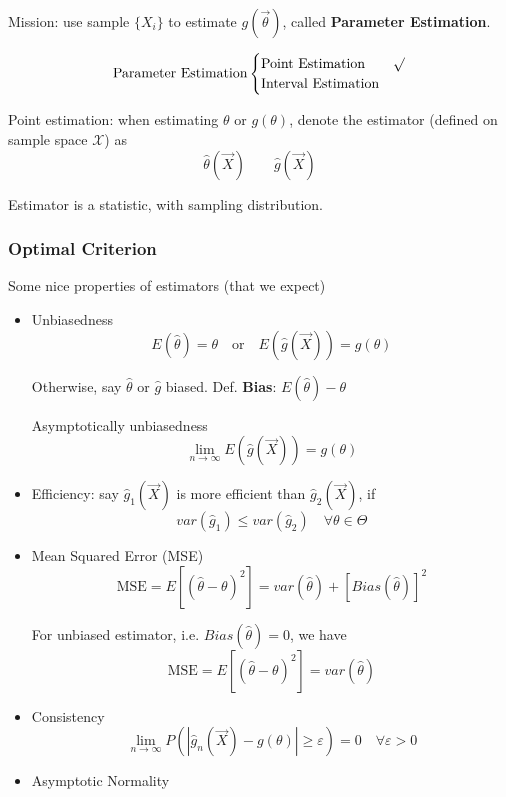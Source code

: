 \documentclass[11pt,a4paper]{ctexart}
\numberwithin{equation}{section}%
\begin{document}
    Mission: use sample $\{X_i\}$ to estimate $g(\vec{\theta})$, called \textbf{Parameter Estimation}.

    \[
        \text{Parameter Estimation}\begin{cases}
            \text{Point Estimation}& \surd\\
            \text{Interval Estimation}&
        \end{cases}    
    \]

    Point estimation: when estimating $\theta$ or $g(\theta)$, denote the estimator (defined on sample space $\mathscr{X}$) as
    \[
        \hat{\theta}(\vec{X})\qquad \hat{g}(\vec{X})    
    \]

    Estimator is a statistic, with sampling distribution.
\subsubsection{Optimal Criterion}\label{SubSectionOptimalCriterion}
        Some nice properties of estimators (that we expect)
    \begin{itemize}
        \item Unbiasedness
        \[
            E(\hat{\theta})=\theta   \quad \text{or}\quad E(\hat{g}(\vec{X})) =g(\theta)
        \]

        Otherwise, say $\hat{\theta}$ or $\hat{g}$ biased. Def. \textbf{Bias}: $E(\hat{\theta})-\theta$

        Asymptotically unbiasedness
        \[
            \lim_{n\to\infty}  E(\hat{g}(\vec{X})) =g(\theta)  
        \]
        \item Efficiency: say $\hat{g}_1(\vec{X})$ is more efficient than $\hat{g}_2(\vec{X})$, if
        \[
            var(\hat{g}_1)\leq var(\hat{g}_2)  \quad\forall\theta\in\Theta  
        \]
        \item Mean Squared Error (MSE)
        \[
            \text{MSE}=E[(\hat{\theta}-\theta)^2]=var(\hat{\theta})+[Bias(\hat{\theta})]^2
        \]

        For unbiased estimator, i.e. $Bias(\hat{\theta})=0$, we have
        \[
            \text{MSE}=E[(\hat{\theta}-\theta)^2]=var(\hat{\theta})
        \]
        \item Consistency
        \[
            \lim_{n\to\infty}P(|\hat{g}_n(\vec{X})-g(\theta)|\geq \varepsilon)=0\quad\forall\varepsilon>0    
        \]
        \item Asymptotic Normality
    \end{itemize}
\end{document}
